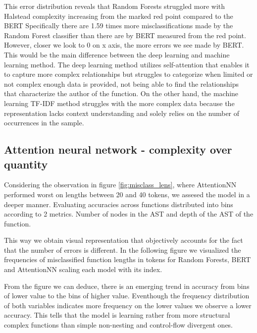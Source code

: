 \documentclass[conference]{IEEEtran}
\begin{document}
This error distribution reveals that Random Forests struggled more with Halstead complexity increasing from the marked red point compared to the BERT 
Specifically there are 1.59 times more misclassifications made by the Random Forest classifier than there are by BERT measured from the red point.
However, closer we look to 0 on x axis, the more errors we see made by BERT. This would be the main difference between the deep learning and 
machine learning method. The deep learning method utilizes self-attention that enables it to capture more complex relationships but struggles
to categorize when limited or not complex enough data is provided, not being able to find the relationships that characterize the author of the function. 
On the other hand, the machine learning TF-IDF method struggles with the more complex data because the representation lacks context understanding and solely 
relies on the number of occurrences in the sample.

\subsection{Attention neural network - complexity over quantity}  \label{subsec:comp_over_quant}

Considering the observation in figure \ref{fig:misclass_lens}, where AttentionNN performed worst on lengths between 20 and 40 tokens,
we assesed the model in a deeper manner. Evaluating accuracies across functions distributed into bins according to 2 metrics. 
Number of nodes in the AST and depth of the AST of the function. 

This way we obtain visual representation that objectively accounts for the fact that the number of errors is different.
In the following figure we visualized the frequencies of misclassified function lengths in tokens for Random Forests, BERT and AttentionNN scaling each 
model with its index.

From the figure we can deduce, there is an emerging trend in accuracy from bins of lower value to the bins of higher value.
Eventhough the frequency distribution of both variables indicates more frequency on the lower values we observe a lower
accuracy. This tells that the model is learning rather from more structural complex functions than simple non-nesting and 
control-flow divergent ones.
\end{document}

